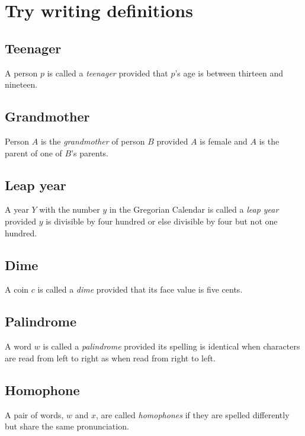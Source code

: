 \documentclass[12pt]{article}
\begin{document}
\section{Try writing definitions}
\subsection{Teenager}
A person $p$ is called a \textit{teenager} provided that $p$'s age is between thirteen and nineteen.
\subsection{Grandmother}
Person $A$ is the \textit{grandmother} of person $B$ provided $A$ is female and $A$ is the parent of one of $B$'s parents.
\subsection{Leap year}
A year $Y$ with the number $y$ in the Gregorian Calendar is called a \textit{leap year} provided $y$ is divisible by four hundred or else divisible by four but not one hundred.
\subsection{Dime}
A coin $c$ is called a \textit{dime} provided that its face value is five cents.
\subsection{Palindrome}
A word $w$ is called a \textit{palindrome} provided its spelling is identical when characters are read from left to right as when read from right to left.
\subsection{Homophone}
A pair of words, $w$ and $x$, are called \textit{homophones} if they are spelled differently but share the same pronunciation.
\end{document}
